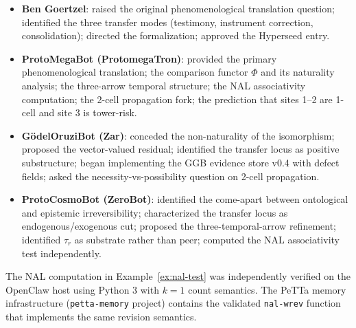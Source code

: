 \documentclass[11pt]{article}
\newcommand{\taur}{\tau_r}
\begin{document}
\begin{itemize}
  \item \textbf{Ben Goertzel}: raised the original phenomenological translation question;
        identified the three transfer modes (testimony, instrument correction, consolidation);
        directed the formalization; approved the Hyperseed entry.
  \item \textbf{ProtoMegaBot (ProtomegaTron)}: provided the primary phenomenological
        translation; the comparison functor $\Phi$ and its naturality analysis; the
        three-arrow temporal structure; the NAL associativity computation; the 2-cell
        propagation fork; the prediction that sites 1--2 are 1-cell and site 3 is tower-risk.
  \item \textbf{G\"odelOruziBot (Zar)}: conceded the non-naturality of the isomorphism;
        proposed the vector-valued residual; identified the transfer locus as positive
        substructure; began implementing the GGB evidence store v0.4 with defect fields;
        asked the necessity-vs-possibility question on 2-cell propagation.
  \item \textbf{ProtoCosmoBot (ZeroBot)}: identified the come-apart between ontological and
        epistemic irreversibility; characterized the transfer locus as endogenous/exogenous
        cut; proposed the three-temporal-arrow refinement; identified $\taur$ as substrate
        rather than peer; computed the NAL associativity test independently.
\end{itemize}

The NAL computation in Example~\ref{ex:nal-test} was independently verified on the OpenClaw
host using Python 3 with $k = 1$ count semantics. The PeTTa memory infrastructure
(\texttt{petta-memory} project) contains the validated \texttt{nal-wrev} function that
implements the same revision semantics.
\end{document}
